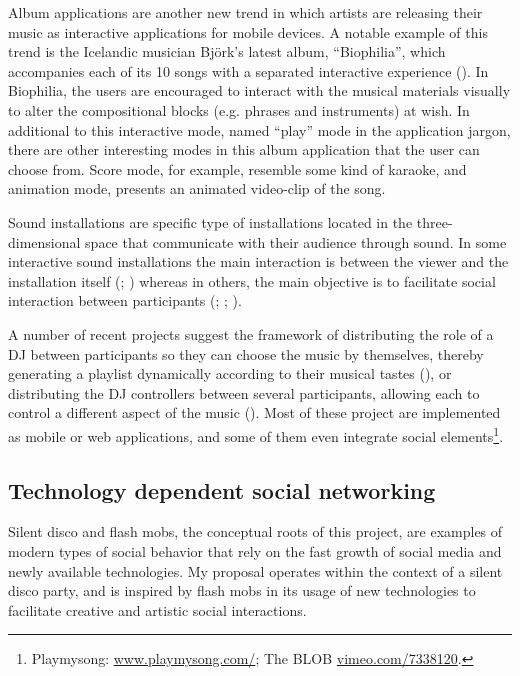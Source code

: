 \documentclass[a4paper,11pt]{article}
\begin{document}
Album applications are another new trend in which artists are releasing their music as interactive applications for mobile devices.
A notable example of this trend is the Icelandic musician Bj\"{o}rk's latest album, ``Biophilia'', which accompanies each of its 10 songs with a separated interactive experience (\cite{stimulant13}).
In Biophilia, the users are encouraged to interact with the musical materials visually to alter the compositional blocks (e.g. phrases and instruments) at wish.
In additional to this interactive mode, named ``play'' mode in the application jargon, there are other interesting modes in this album application that the user can choose from.
Score mode, for example, resemble some kind of karaoke, and animation mode, presents an animated video-clip of the song.

Sound installations are specific type of installations located in the three-dimensional space that communicate with their audience through sound.
In some interactive sound installations the main interaction is between the viewer and the installation itself (\cite{web:visnjic}; \cite{web:cardiff01}) whereas in others, the main objective is to facilitate social interaction between participants (\cite{eng03}; \cite{web:kirn12}; \cite{web:murray-browne13}).

A number of recent projects suggest the framework of distributing the role of a DJ between participants so they can choose the music by themselves, thereby generating a playlist dynamically according to their musical tastes (\cite{web:shaw}), or distributing the DJ controllers between several participants, allowing each to control a different aspect of the music (\cite{web:shapira}).
Most of these project are implemented as mobile or web applications, and some of them even integrate social elements\footnote{Playmysong: \href{http://www.playmysong.com/}{www.playmysong.com/}; The BLOB \href{http://vimeo.com/7338120}{vimeo.com/7338120}.}.

\subsection{Technology dependent social networking} \label{literature:social_tech}

Silent disco and flash mobs, the conceptual roots of this project, are examples of modern types of social behavior that rely on the fast growth of social media and newly available technologies.
My proposal operates within the context of a silent disco party, and is inspired by flash mobs in its usage of new technologies to facilitate creative and artistic social interactions.
\end{document}
